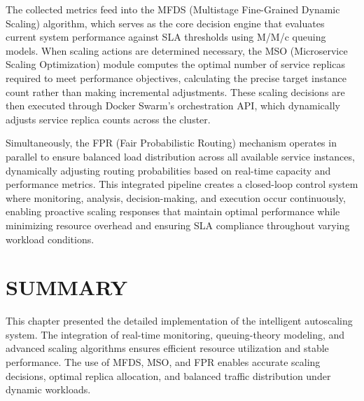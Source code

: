 The collected metrics feed into the MFDS (Multistage Fine-Grained Dynamic Scaling) algorithm, which serves as the core decision engine that evaluates current system performance against SLA thresholds using M/M/c queuing models. When scaling actions are determined necessary, the MSO (Microservice Scaling Optimization) module computes the optimal number of service replicas required to meet performance objectives, calculating the precise target instance count rather than making incremental adjustments. These scaling decisions are then executed through Docker Swarm's orchestration API, which dynamically adjusts service replica counts across the cluster.

Simultaneously, the FPR (Fair Probabilistic Routing) mechanism operates in parallel to ensure balanced load distribution across all available service instances, dynamically adjusting routing probabilities based on real-time capacity and performance metrics. This integrated pipeline creates a closed-loop control system where monitoring, analysis, decision-making, and execution occur continuously, enabling proactive scaling responses that maintain optimal performance while minimizing resource overhead and ensuring SLA compliance throughout varying workload conditions.

\section{SUMMARY}

This chapter presented the detailed implementation of the intelligent autoscaling system. The integration of real-time monitoring, queuing-theory modeling, and advanced scaling algorithms ensures efficient resource utilization and stable performance. The use of MFDS, MSO, and FPR enables accurate scaling decisions, optimal replica allocation, and balanced traffic distribution under dynamic workloads.